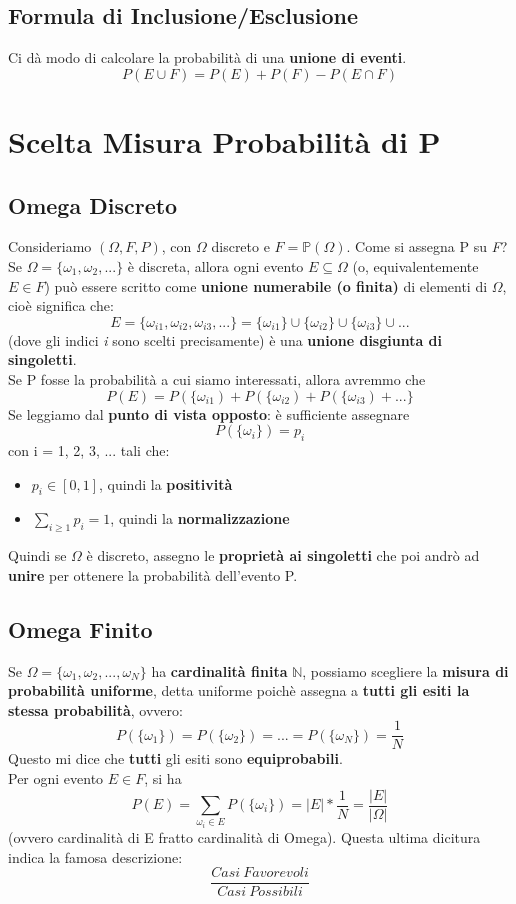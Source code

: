 \documentclass{report}
\newcommand{\N}{\mathbb{N}}
\newcommand{\Pn}{\mathbb{P}}
\begin{document}
\subsection{Formula di Inclusione/Esclusione}
Ci dà modo di calcolare la probabilità di una \textbf{unione di eventi}.
    \[P(E \cup F) = P(E) + P(F) - P(E \cap F)\]
\section{Scelta Misura Probabilità di P}
\subsection{Omega Discreto}
Consideriamo \((\Omega, \textit{F}, P)\), con \(\Omega\) discreto e \(\textit{F} = \Pn(\Omega)\). Come si assegna P su \textit{F}?\\
Se \(\Omega = \{\omega_1, \omega_2, ... \}\) è discreta, allora ogni evento \(E \subseteq \Omega\) (o, equivalentemente \(E \in \textit{F}\)) può essere scritto come \textbf{unione numerabile (o finita)} di elementi di \(\Omega\), cioè significa che: \[E = \{\omega_{i1}, \omega_{i2}, \omega_{i3}, ...\} = \{\omega_{i1}\} \cup \{\omega_{i2}\} \cup \{\omega_{i3}\} \cup ...\] (dove gli indici \textit{i} sono scelti precisamente) è una \textbf{unione disgiunta di singoletti}.\\
Se P fosse la probabilità a cui siamo interessati, allora avremmo che \[P(E) = P(\{\omega_{i1}) + P(\{\omega_{i2}) + P(\{\omega_{i3}) + ...\}\]
Se leggiamo dal \textbf{punto di vista opposto}: è sufficiente assegnare \[P(\{\omega_{i}\}) = p_i\] con i = 1, 2, 3, ... tali che: \begin{itemize}
    \item \(p_i \in [0, 1]\), quindi la \textbf{positività}
    \item \(\sum_{i \geq 1} p_i = 1\), quindi la \textbf{normalizzazione}
\end{itemize}
Quindi se \(\Omega\) è discreto, assegno le \textbf{proprietà ai singoletti} che poi andrò ad \textbf{unire} per ottenere la probabilità dell'evento P.
\subsection{Omega Finito}
Se \(\Omega = \{\omega_1, \omega_2, ..., \omega_N\}\) ha \textbf{cardinalità finita} \(\N\), possiamo scegliere la \textbf{misura di probabilità uniforme}, detta uniforme poichè assegna a \textbf{tutti gli esiti la stessa probabilità}, ovvero: \[P(\{\omega_1\}) = P(\{\omega_2\}) = ... = P(\{\omega_N\}) = \frac{1}{N}\] Questo mi dice che \textbf{tutti} gli esiti sono \textbf{equiprobabili}.\\
Per ogni evento \(E \in \textit{F}\), si ha \[P(E) = \sum_{\omega_i \in E} P(\{\omega_i\}) = |E| * \frac{1}{N} = \frac{|E|}{|\Omega|}\] (ovvero cardinalità di E fratto cardinalità di Omega). Questa ultima dicitura indica la famosa descrizione: \[\frac{Casi\ Favorevoli}{Casi\ Possibili}\]
\end{document}
